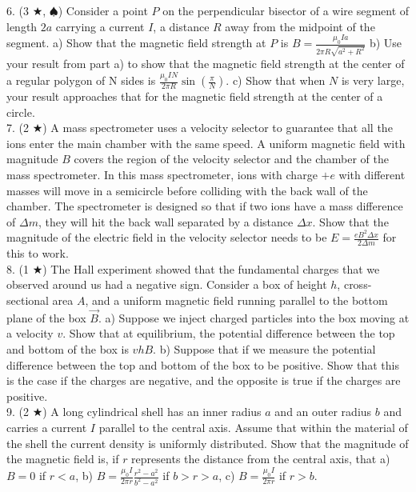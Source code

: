 6. (3 $\bigstar$, $\spadesuit$) Consider a point $P$ on the perpendicular bisector of a wire segment of length $2a$ carrying a current $I$, a distance $R$ away from the midpoint of the segment. a) Show that the magnetic field strength at $P$ is $B = \frac{\mu_0Ia}{2\pi R\sqrt{a^2 + R^2}}$ b) Use your result from part a) to show that the magnetic field strength at the center of a regular polygon of N sides is $\frac{\mu_0IN}{2\pi R} \sin \left(\frac{\pi}{N}\right)$. c) Show that when $N$ is very large, your result approaches that for the magnetic field strength at the center of a circle.\\
7. (2 $\bigstar$) A mass spectrometer uses a velocity selector to guarantee that all the ions enter the main chamber with the same speed. A uniform magnetic field with magnitude $B$ covers the region of the velocity selector and the chamber of the mass spectrometer. In this mass spectrometer, ions with charge $+e$ with different masses will move in a semicircle before colliding with the back wall of the chamber. The spectrometer is designed so that if two ions have a mass difference of $\Delta m$, they will hit the back wall separated by a distance $\Delta x$. Show that the magnitude of the electric field in the velocity selector needs to be $E = \frac{eB^2\Delta x}{2\Delta m}$ for this to work. \\
8. (1 $\bigstar$) The Hall experiment showed that the fundamental charges that we observed around us had a negative sign. Consider a box of height $h$, cross-sectional area $A$, and a uniform magnetic field running parallel to the bottom plane of the box $\vec B$. a) Suppose we inject charged particles into the box moving at a velocity $v$. Show that at equilibrium, the potential difference between the top and bottom of the box is $vhB$. b) Suppose that if we measure the potential difference between the top and bottom of the box to be positive. Show that this is the case if the charges are negative, and the opposite is true if the charges are positive. \\
9. (2 $\bigstar$) A long cylindrical shell has an inner radius $a$ and an outer radius $b$ and carries a current $I$ parallel to the central axis. Assume that within the material of the shell the current density is uniformly distributed. Show that the magnitude of the magnetic field is, if $r$ represents the distance from the central axis, that a) $B = 0$ if $r < a$, b) $B = \frac{\mu_0 I}{2\pi r}\frac{r^2 - a^2}{b^2 - a^2}$ if $b > r > a$, c) $B = \frac{\mu_0 I}{2 \pi r}$ if $r > b$.\\
